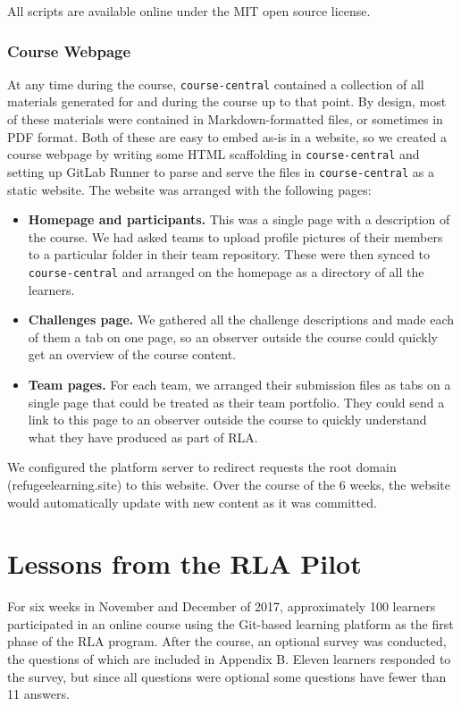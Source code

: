 \documentclass[12pt,twoside]{mitthesis}
\begin{document}
All scripts are available online under the MIT open source license.~\cite{rlascripts}

\subsection{Course Webpage}

At any time during the course, \texttt{course-central} contained a collection of all materials generated for and during the course up to that point. By design, most of these materials were contained in Markdown-formatted files, or sometimes in PDF format. Both of these are easy to embed as-is in a website, so we created a course webpage by writing some HTML scaffolding in \texttt{course-central} and setting up GitLab Runner to parse and serve the files in \texttt{course-central} as a static website. The website was arranged with the following pages:
\begin{itemize}
\item \textbf{Homepage and participants.} This was a single page with a description of the course. We had asked teams to upload profile pictures of their members to a particular folder in their team repository. These were then synced to \texttt{course-central} and arranged on the homepage as a directory of all the learners.
\item \textbf{Challenges page.} We gathered all the challenge descriptions and made each of them a tab on one page, so an observer outside the course could quickly get an overview of the course content.
\item \textbf{Team pages.} For each team, we arranged their submission files as tabs on a single page that could be treated as their team portfolio. They could send a link to this page to an observer outside the course to quickly understand what they have produced as part of RLA.
\end{itemize}
We configured the platform server to redirect requests the root domain (refugeelearning.site) to this website. Over the course of the 6 weeks, the website would automatically update with new content as it was committed.

\chapter{Lessons from the RLA Pilot}

For six weeks in November and December of 2017, approximately 100 learners participated in an online course using the Git-based learning platform as the first phase of the RLA program. After the course, an optional survey was conducted, the questions of which are included in Appendix B. Eleven learners responded to the survey, but since all questions were optional some questions have fewer than 11 answers.
\end{document}
